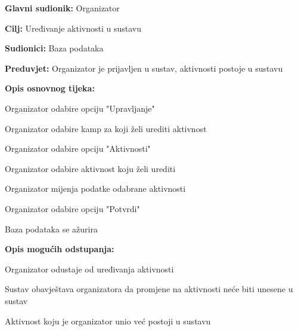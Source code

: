 					\noindent {}
					\begin{packed_item}
						
						\item \textbf{Glavni sudionik: }Organizator
						\item  \textbf{Cilj:} Uređivanje aktivnosti u sustavu
						\item  \textbf{Sudionici:} Baza podataka
						\item  \textbf{Preduvjet:} Organizator je prijavljen u sustav, aktivnosti postoje u sustavu
						\item  \textbf{Opis osnovnog tijeka:}
						
						\item[] \begin{packed_enum}
							
							
							\item Organizator odabire opciju "Upravljanje"
							\item Organizator odabire kamp za koji želi urediti aktivnost
							\item Organizator odabire opciju "Aktivnosti"
							\item Organizator odabire aktivnost koju želi urediti
							\item Organizator mijenja podatke odabrane aktivnosti
							\item Organizator odabire opciju "Potvrdi"
							\item Baza podataka se ažurira
						\end{packed_enum}
						
						\item  \textbf{Opis mogućih odstupanja:}
						
						\item[] \begin{packed_item}
							
							\item[3.a] Organizator odustaje od uređivanja aktivnosti
							\item[] \begin{packed_enum}
								
								\item Sustav obavještava organizatora da promjene na aktivnosti neće biti unesene u sustav
								
							\end{packed_enum}
							
							\item[6.a] Aktivnost koju je organizator unio već postoji u sustavu
							\item[] \begin{packed_enum}
								

\end{packed_enum}
\end{packed_item}
\end{packed_item}
